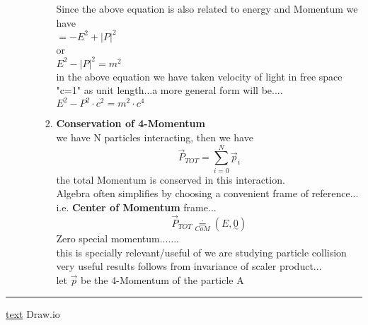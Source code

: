 \documentclass[11pt,a4paper]{article}
\begin{document}
\begin{enumerate}
\begin{enumerate}
\begin{enumerate}
                                    Since the above equation is also related to energy and Momentum we have\\
                                    $=-E^2 + \lvert P \rvert^2$\\
                                    or \\
                                    $E^2 - \lvert P \rvert^2 = m^2$\\
                                    in the above equation we have taken velocity of light in free space "c=1" as unit length...a more general form will be....\\
                                    $E^2 -  P^2 \cdot c^2= m^2\cdot c^4$\\
                              \item \textbf{Conservation of 4-Momentum}\\
                                    we have N particles interacting, then we have\\
                                    \[\vec{P}_{TOT}= \sum_{i=0}^{N}\vec{p}_{i}\]
                                    the total Momentum is conserved in this interaction.\\
                                    Algebra often simplifies by choosing a convenient frame of reference...\\
                                    i.e. \textbf{Center of Momentum} frame...\\
                                    \[\vec{P}_{TOT} \mathop = \limits^{\cdot}_{CoM} (E,\underset{\sim}{0})\]
                                    Zero special momentum.......\\
                                    this is specially relevant/useful of we are studying particle collision\\
                                    very useful results follows from invariance of scaler product...\\
                                    let $\vec{p}$ be the 4-Momentum of the particle A\\


                        \end{enumerate}
            \end{enumerate}
\end{enumerate}
\noindent\rule{\textwidth}{1pt}
\href{https://youtu.be/TiHHz3sKDbY?list=PL6Q1107aDr%SgQ1DBEugejXLfQX76hfSnX&t=1188}{text} Draw.io
\end{document}
